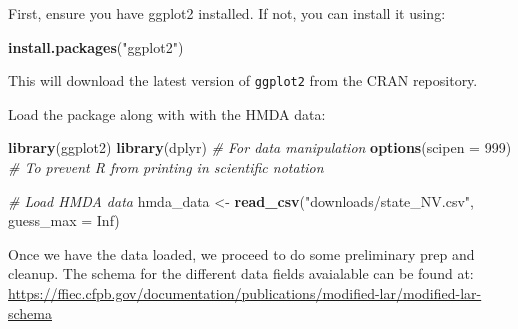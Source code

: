 \documentclass[
]{book}
\newenvironment{Shaded}{\begin{snugshade}}{\end{snugshade}}
\newcommand{\AttributeTok}[1]{\textcolor[rgb]{0.13,0.29,0.53}{#1}}
\newcommand{\CommentTok}[1]{\textcolor[rgb]{0.56,0.35,0.01}{\textit{#1}}}
\newcommand{\ConstantTok}[1]{\textcolor[rgb]{0.56,0.35,0.01}{#1}}
\newcommand{\DecValTok}[1]{\textcolor[rgb]{0.00,0.00,0.81}{#1}}
\newcommand{\FunctionTok}[1]{\textcolor[rgb]{0.13,0.29,0.53}{\textbf{#1}}}
\newcommand{\NormalTok}[1]{#1}
\newcommand{\OtherTok}[1]{\textcolor[rgb]{0.56,0.35,0.01}{#1}}
\newcommand{\StringTok}[1]{\textcolor[rgb]{0.31,0.60,0.02}{#1}}
\begin{document}
First, ensure you have ggplot2 installed. If not, you can install it using:

\begin{Shaded}
\begin{Highlighting}[]
\FunctionTok{install.packages}\NormalTok{(}\StringTok{"ggplot2"}\NormalTok{)}
\end{Highlighting}
\end{Shaded}

This will download the latest version of \texttt{ggplot2} from the CRAN repository.

Load the package along with with the HMDA data:

\begin{Shaded}
\begin{Highlighting}[]
\FunctionTok{library}\NormalTok{(ggplot2)}
\FunctionTok{library}\NormalTok{(dplyr)  }\CommentTok{\# For data manipulation}
\FunctionTok{options}\NormalTok{(}\AttributeTok{scipen =} \DecValTok{999}\NormalTok{) }\CommentTok{\# To prevent R from printing in scientific notation}

\CommentTok{\# Load HMDA data}
\NormalTok{hmda\_data }\OtherTok{\textless{}{-}} \FunctionTok{read\_csv}\NormalTok{(}\StringTok{"downloads/state\_NV.csv"}\NormalTok{, }\AttributeTok{guess\_max =} \ConstantTok{Inf}\NormalTok{)}
\end{Highlighting}
\end{Shaded}

Once we have the data loaded, we proceed to do some preliminary prep and cleanup. The schema for the different data fields avaialable can be found at: \url{https://ffiec.cfpb.gov/documentation/publications/modified-lar/modified-lar-schema}
\end{document}
